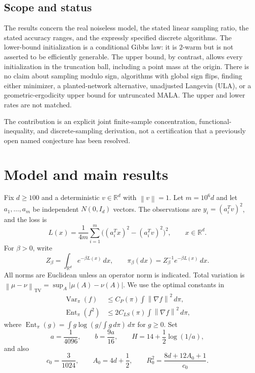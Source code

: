 \documentclass[11pt,letterpaper]{article}
\numberwithin{equation}{section}
\theoremstyle{remark}
\newcommand{\R}{\mathbb R}
\newcommand{\Var}{\operatorname{Var}}
\newcommand{\Ent}{\operatorname{Ent}}
\newcommand{\TV}{\mathrm{TV}}
\newcommand{\1}{\mathbf 1}
\newcommand{\norm}[1]{\left\lVert#1\right\rVert}
\newcommand{\abs}[1]{\left\lvert#1\right\rvert}
\begin{document}
\subsection{Scope and status}

The results concern the real noiseless model, the stated linear sampling ratio, the stated accuracy ranges, and the expressly specified discrete algorithms. The lower-bound initialization is a conditional Gibbs law: it is $2$-warm but is not asserted to be efficiently generable. The upper bound, by contrast, allows every initialization in the truncation ball, including a point mass at the origin. There is no claim about sampling modulo sign, algorithms with global sign flips, finding either minimizer, a planted-network alternative, unadjusted Langevin (ULA), or a geometric-ergodicity upper bound for untruncated MALA. The upper and lower rates are not matched.

The contribution is an explicit joint finite-sample concentration, functional-inequality, and discrete-sampling derivation, not a certification that a previously open named conjecture has been resolved.

\section{Model and main results}\label{sec:results}

Fix $d\ge100$ and a deterministic $v\in\R^d$ with $\norm v=1$. Let $m=10^6d$ and let $a_1,\ldots,a_m$ be independent $N(0,I_d)$ vectors. The observations are $y_i=(a_i^Tv)^2$, and the loss is
\begin{equation}\label{eq:loss}
 L(x)=\frac1{4m}\sum_{i=1}^m\big((a_i^Tx)^2-(a_i^Tv)^2\big)^2,
 \qquad x\in\R^d.
\end{equation}
For $\beta>0$, write
\begin{equation}\label{eq:gibbs}
 Z_\beta=\int_{\R^d}e^{-\beta L(x)}\,dx,
 \qquad \pi_\beta(dx)=Z_\beta^{-1}e^{-\beta L(x)}\,dx.
\end{equation}
All norms are Euclidean unless an operator norm is indicated. Total variation is $\norm{\mu-\nu}_{\TV}=\sup_A\abs{\mu(A)-\nu(A)}$.
We use the optimal constants in
\begin{align}
 \Var_{\pi}(f)&\le C_P(\pi)\int\norm{\nabla f}^2\,d\pi,\label{eq:pi}\\
 \Ent_{\pi}(f^2)&\le2C_{LS}(\pi)\int\norm{\nabla f}^2\,d\pi,\label{eq:lsi}
\end{align}
where $\Ent_\pi(g)=\int g\log(g/\int g\,d\pi)\,d\pi$ for $g\ge0$. Set
\begin{equation}\label{eq:constants}
 a=\frac1{4096},\qquad b=\frac{9a}{16},\qquad
 H=14+\frac12\log(1/a),
\end{equation}
and also
\begin{equation}\label{eq:convconstants}
 c_0=\frac3{1024},\qquad A_0=4d+\frac12,\qquad
 R_0^2=\frac{8d+12A_0+1}{c_0}.
\end{equation}
\end{document}
